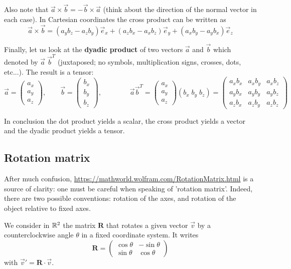 Also note that $\vec{a} \times \vec{b} = - \vec{b} \times \vec{a}$ (think about the direction of the 
normal vector in each case). In Cartesian coordinates the cross product can be written as
\[
\vec{a} \times \vec{b} = (a_yb_z-a_zb_y) \vec{e}_x + (a_zb_x-a_xb_z) \vec{e}_y + (a_xb_y-a_yb_x) \vec{e}_z  
\]

Finally, let us look at the {\bf dyadic product} of two vectors $\vec{a}$ and $\vec{b}$ which denoted by
$\vec{a}\; \vec{b}^T$ (juxtaposed; no symbols, multiplication signs, crosses, dots, etc...). The 
result is a tensor:
\[
\vec{a}=
\left(
\begin{array}{c}
a_x \\ a_y \\ a_z
\end{array}
\right),
\qquad
\vec{b}=
\left(
\begin{array}{c}
b_x \\ b_y \\ b_z
\end{array}
\right),
\qquad\qquad
\vec{a}\vec{b}^T 
=
\left(
\begin{array}{c}
a_x \\ a_y \\ a_z
\end{array}
\right)
(b_x \; b_y \; b_z)
=
\left(
\begin{array}{ccc}
a_x b_x & a_xb_y & a_xb_z \\
a_y b_x & a_yb_y & a_yb_z \\
a_z b_x & a_zb_y & a_zb_z 
\end{array}
\right)
\]

In conclusion the dot product yields a scalar, the cross product yields a vector and the dyadic 
product yields a tensor. 






\subsection{Rotation matrix}

After much confusion, \url{https://mathworld.wolfram.com/RotationMatrix.html}
is a source of clarity: one must be careful when speaking of 'rotation matrix'.
Indeed, there are two possible conventions: rotation of the axes, and rotation 
of the object relative to fixed axes.

We consider in ${\mathbb{R}}^2$ the matrix ${\bm R}$ that rotates a given vector $\vec{v}$
by a counterclockwise angle $\theta$ in a fixed coordinate system.
It writes
\[
{\bm R}=
\left(
\begin{array}{cc}
\cos\theta & -\sin \theta \\
\sin\theta & \cos\theta
\end{array}
\right)
\]
with $\vec{v}'={\bm R}\cdot \vec{v}$.

